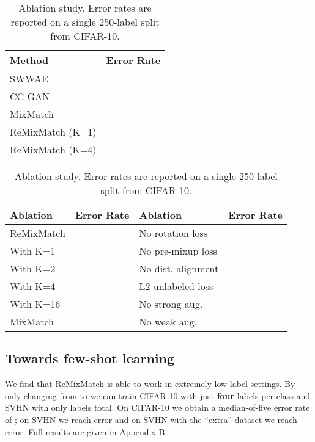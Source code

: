 \documentclass{article} \usepackage{iclr2020_conference,times}
\begin{document}
\begin{table}[h]
    \centering
    \footnotesize
    \begin{minipage}{.37\linewidth}
    \begin{tabular}{lr}
    \toprule
      Method & Error Rate \\
      \midrule
SWWAE &  \\CC-GAN  &  \\MixMatch &  \\ \midrule
      ReMixMatch (K=1) &  \\ReMixMatch (K=4) &  \\\bottomrule
    \end{tabular}
    \caption{STL-10 error rate using -label splits. SWWAE and CC-GAN results are from \citep{zhao2015stacked} and \citep{denton2016semi}.} \label{tab:stl10}
    \end{minipage}\hfill \begin{minipage}{.6\linewidth}
    \centering
    \begin{tabular}{lrlr}
    \toprule
        Ablation & Error Rate & Ablation & Error Rate \\
        \midrule
        ReMixMatch &  & No rotation loss &  \\
        With K=1 &  & No pre-mixup loss &  \\
        With K=2 &  & No dist. alignment &  \\
        With K=4 &  & L2 unlabeled loss &  \\
        With K=16 &  & No strong aug. &  \\
        MixMatch &  & No weak aug. &  \\
        \bottomrule
    \end{tabular}
    \caption{Ablation study. Error rates are reported on a single 250-label split from CIFAR-10.}
    \label{tab:ablation}
    \end{minipage}
\end{table}


\subsection{Towards few-shot learning}

We find that ReMixMatch is able to work in extremely low-label
settings. By only changing  from  to  we
can train CIFAR-10 with just \textbf{four} labels 
per class and SVHN with only  labels total.
On CIFAR-10 we obtain a median-of-five error rate of ;
on SVHN we reach  error and
on SVHN with the ``extra'' dataset we reach  error.
Full results are given in Appendix B.
\end{document}
